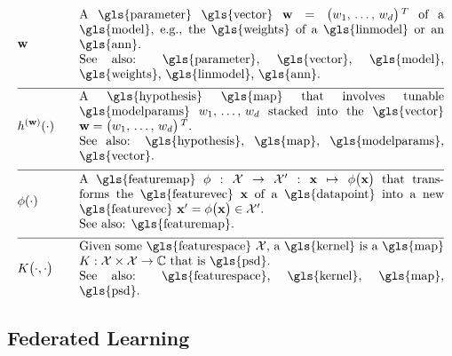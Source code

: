 \begin{align} 
	&\weights  &\quad & \parbox{.85\textwidth}{A \gls{parameter} \gls{vector} $\weights = \big(\weight_{1}, \,\ldots, \,\weight_{\featuredim}\big)\,^{T}$ 
		of a \gls{model}, e.g., the \gls{weights} of a \gls{linmodel} or an \gls{ann}.
		\\ See also: \gls{parameter}, \gls{vector}, \gls{model}, \gls{weights}, \gls{linmodel}, \gls{ann}. }     \nonumber \\[2mm] \hline \nonumber\\[-5mm]
	&\hypothesis^{(\weights)}(\cdot)  &\quad &\parbox{.85\textwidth}{A \gls{hypothesis} \gls{map} that involves tunable \gls{modelparams} 
		$\weight_{1}, \,\ldots, \,\weight_{\featuredim}$ stacked into the \gls{vector} $\weights=\big(\weight_{1}, \,\ldots, \,\weight_{\featuredim} \big)\,^{T}$.
		\\ See also: \gls{hypothesis}, \gls{map}, \gls{modelparams}, \gls{vector}. } \nonumber \\[2mm] \hline \nonumber\\[-5mm]
	&\featuremap(\cdot)  &\quad & \parbox{.85\textwidth}{A \gls{featuremap} 
		$\featuremap: \featurespace \rightarrow \featurespace' : \featurevec \mapsto \featuremap\big( \featurevec \big)$ that 
		transforms the \gls{featurevec} $\featurevec$ of a \gls{datapoint} into a new \gls{featurevec} $\featurevec'= \featuremap\big( \featurevec \big) \in \featurespace'$.
		\\ See also: \gls{featuremap}. }   \nonumber \\[2mm] \hline \nonumber\\[-5mm]
	&\kernelmap{\cdot}{\cdot} &\quad & \parbox{.85\textwidth}{Given some \gls{featurespace} $\featurespace$, 
		a \gls{kernel} is a \gls{map} $\kernel: \featurespace \times \featurespace \rightarrow \mathbb{C}$ that is \gls{psd}.
		\\ See also: \gls{featurespace}, \gls{kernel}, \gls{map}, \gls{psd}. }    \nonumber                                                                                                                                                     
\end{align}              






\newpage
\subsection*{Federated Learning}

